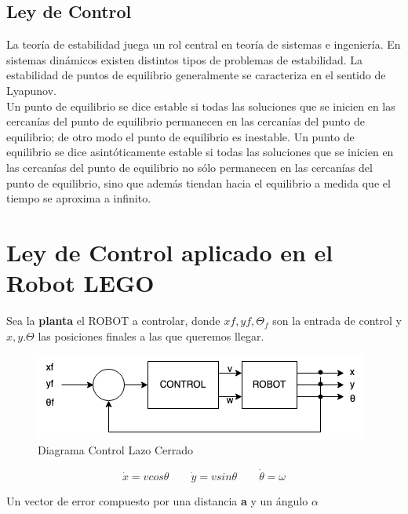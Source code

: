 \documentclass[oneside,onecolumn]{article}
\begin{document}
\subsection{Ley de Control}

La teoría de estabilidad juega un rol central en teoría de sistemas e ingeniería. En sistemas dinámicos existen distintos tipos de problemas de estabilidad. La estabilidad de puntos de equilibrio generalmente se caracteriza en el sentido de Lyapunov. \\

Un punto de equilibrio se dice estable si todas las soluciones que se inicien en las cercanías del punto de equilibrio permanecen en las cercanías del punto de equilibrio; de otro modo el punto de equilibrio es inestable. Un punto de equilibrio se dice asintóticamente estable si todas las soluciones que se inicien en las cercanías del punto de equilibrio no sólo permanecen en las cercanías del punto de equilibrio, sino que además tiendan hacia el equilibrio a medida que el tiempo se aproxima a infinito.


\section{Ley de Control aplicado en el Robot LEGO}

Sea la \textbf{planta} el ROBOT a controlar, donde $xf, yf, \Theta_{f}$ son la entrada de control y $x, y. \Theta$ las posiciones finales a las que queremos llegar.

\begin{figure}[h]
  \centering
  \includegraphics[scale=0.7]{graficos/bloque.png}
  \caption{Diagrama Control Lazo Cerrado}
\end{figure}

\[\dot{x} = v cos \theta \qquad \dot{y} = v sin \theta \qquad \dot{\theta} = \omega \]

Un vector de error compuesto por una distancia \textbf{a} y un ángulo \textbf{$\alpha$} 
\end{document}
